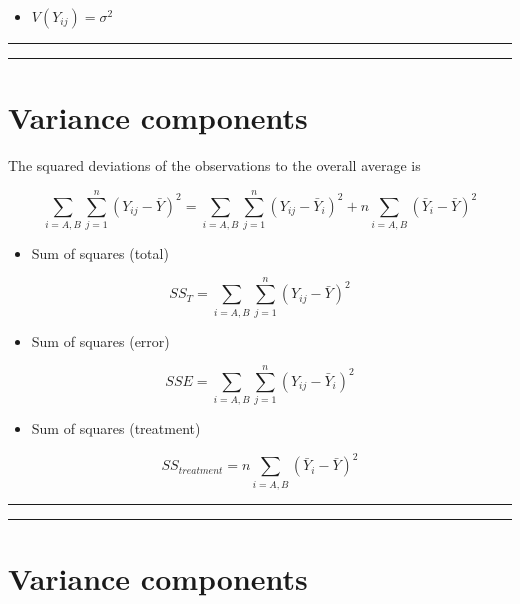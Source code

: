 \documentclass[
]{book}
\providecommand{\tightlist}{%
  \setlength{\itemsep}{0pt}\setlength{\parskip}{0pt}}
\begin{document}
\begin{itemize}
\tightlist
\item
  \(V(Y_{ij})=\sigma^2\)
\end{itemize}

\begin{center}\rule{0.5\linewidth}{0.5pt}\end{center}

\begin{center}\rule{0.5\linewidth}{0.5pt}\end{center}

\hypertarget{variance-components}{%
\section{Variance components}\label{variance-components}}

The squared deviations of the observations to the overall average is

\[\sum_{i=A,B}\sum_{j=1}^n(Y_{ij}-\bar{Y})^2= \sum_{i=A,B}\sum_{j=1}^n(Y_{ij}-\bar{Y}_i)^2+n\sum_{i=A,B}(\bar{Y}_{i}-\bar{Y})^2\]

\begin{itemize}
\tightlist
\item
  Sum of squares (total)
\end{itemize}

\[SS_T=\sum_{i=A,B}\sum_{j=1}^n(Y_{ij}-\bar{Y})^2\]

\begin{itemize}
\tightlist
\item
  Sum of squares (error)
\end{itemize}

\[SSE=\sum_{i=A,B}\sum_{j=1}^n(Y_{ij}-\bar{Y}_i)^2\]

\begin{itemize}
\tightlist
\item
  Sum of squares (treatment)
\end{itemize}

\[SS_{treatment}=n\sum_{i=A,B}(\bar{Y}_{i}-\bar{Y})^2\]

\begin{center}\rule{0.5\linewidth}{0.5pt}\end{center}

\begin{center}\rule{0.5\linewidth}{0.5pt}\end{center}

\hypertarget{variance-components-1}{%
\section{Variance components}\label{variance-components-1}}
\end{document}
